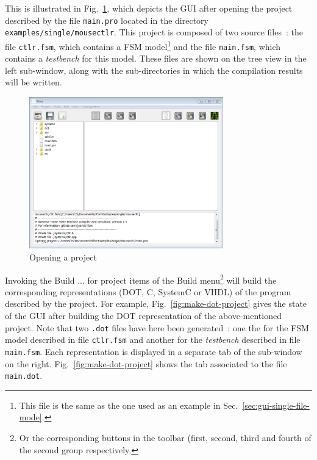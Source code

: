 This is illustrated in Fig.~\ref{fig:open-project}, which depicts the GUI after opening the project
described by the file \verb|main.pro| located in the directory \texttt{examples/single/mousectlr}.
This project is composed of two source files~: the file \verb|ctlr.fsm|, which contains a FSM
model\footnote{This file is the same as the one used as an example in
  Sec.~\ref{sec:gui-single-file-mode}.} and the file \verb|main.fsm|, which contains a
\emph{testbench} for this model. These files are shown on the tree view in the left sub-window,
along with the sub-directories in which the compilation results will be written. 

\begin{figure}[h]
  \centering
  \includegraphics[width=0.75\textwidth]{figs/gui/open-project}
  \caption{Opening a project}
  \label{fig:open-project}
\end{figure}

Invoking the \textsf{Build ... for project} items of the \textsf{Build} menu\footnote{Or the
  corresponding buttons in the toolbar (first, second, third and fourth of the second group
  respectively.} will build the corresponding representations (DOT, C, SystemC or VHDL) of the
program described by the project.  For example, Fig.~\ref{fig:make-dot-project} gives the state of
the GUI after building the DOT representation of the above-mentioned project. Note that two
\verb|.dot| files have here been generated~: one the for the FSM model described in file
\verb|ctlr.fsm| and another for the \emph{testbench} described in file \verb|main.fsm|. Each
representation is displayed in a separate tab of the sub-window on the
right. Fig.~\ref{fig:make-dot-project} shows the tab associated to the file \verb|main.dot|. 


